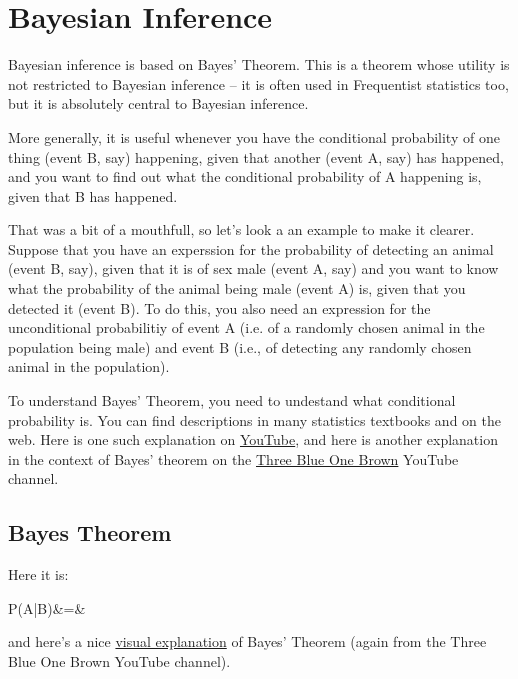 
\section{Bayesian Inference}

Bayesian inference is based on Bayes' Theorem. This is a theorem whose utility is not restricted to Bayesian inference -- it is often used in Frequentist statistics too, but it is absolutely central to Bayesian inference. 

More generally, it is useful whenever you have the conditional probability of one thing (event B, say) happening, given that another (event A, say) has happened, and you want to find out what the conditional probability of A happening is, given that B has happened. 

That was a bit of a mouthfull, so let's look a an example to make it clearer. Suppose that you have an experssion for the probability of detecting an animal (event B, say), given that it is of sex male (event A, say) and you want to know what the probability of the animal being male (event A) is, given that you detected it (event B). To do this, you also need an expression for the unconditional probabilitiy of event A (i.e. of a randomly chosen animal in the population being male) and event B (i.e., of detecting any randomly chosen animal in the population). 

To understand Bayes' Theorem, you need to undestand what conditional probability is. You can find descriptions in many statistics textbooks and on the web. Here is one such explanation on \href{https://www.youtube.com/watch?v=ibINrxJLvlM}{YouTube}, and here is another explanation in the context of Bayes' theorem on the \href{https://www.youtube.com/watch?v=U_85TaXbeIo}{Three Blue One Brown} YouTube channel.

\subsection{Bayes Theorem}

Here it is:

\be
P(A|B)&=&\\
\nonumber
\ee
\noindent

and here's a nice \href{https://www.youtube.com/watch?v=HZGCoVF3YvM}{visual explanation} of Bayes' Theorem (again from the Three Blue One Brown YouTube channel).

